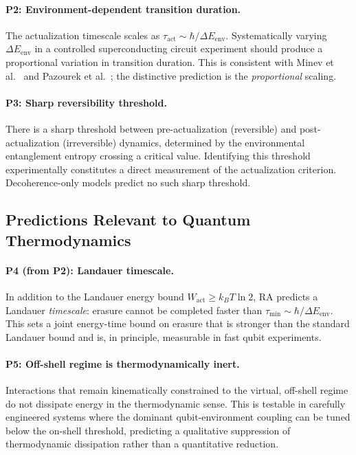 \documentclass[11pt,a4paper]{article}
\theoremstyle{plain}
\theoremstyle{definition}
\theoremstyle{remark}
\begin{document}
\paragraph{P2: Environment-dependent transition duration.}
The actualization timescale scales as $\tau_{\mathrm{act}} \sim \hbar / \Delta
E_{\mathrm{env}}$. Systematically varying $\Delta E_{\mathrm{env}}$ in a
controlled superconducting circuit experiment should produce a proportional
variation in transition duration. This is consistent with Minev et
al.~\citep{Minev2019} and Pazourek et al.~\citep{Pazourek2015}; the distinctive
prediction is the \emph{proportional} scaling.

\paragraph{P3: Sharp reversibility threshold.}
There is a sharp threshold between pre-actualization (reversible) and
post-actualization (irreversible) dynamics, determined by the environmental
entanglement entropy crossing a critical value. Identifying this threshold
experimentally constitutes a direct measurement of the actualization criterion.
Decoherence-only models predict no such sharp threshold.

\subsection{Predictions Relevant to Quantum Thermodynamics}

\paragraph{P4 (from P2): Landauer timescale.}
In addition to the Landauer energy bound $W_{\mathrm{act}} \geq k_B T \ln 2$, RA
predicts a Landauer \emph{timescale}: erasure cannot be completed faster than
$\tau_{\mathrm{min}} \sim \hbar / \Delta E_{\mathrm{env}}$. This sets a joint
energy-time bound on erasure that is stronger than the standard Landauer bound and
is, in principle, measurable in fast qubit experiments.

\paragraph{P5: Off-shell regime is thermodynamically inert.}
Interactions that remain kinematically constrained to the virtual, off-shell regime
do not dissipate energy in the thermodynamic sense. This is testable in carefully
engineered systems where the dominant qubit-environment coupling can be tuned below
the on-shell threshold, predicting a qualitative suppression of thermodynamic
dissipation rather than a quantitative reduction.
\end{document}
